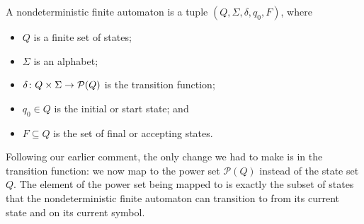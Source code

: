 \begin{definition}\label{def:NFA}
A nondeterministic finite automaton is a tuple $(Q, \Sigma, \delta, q_{0}, F)$, where
\begin{itemize}
\item $Q$ is a finite set of states;
\item $\Sigma$ is an alphabet;
\item $\delta \colon Q \times \Sigma \to \mathcal{P}(Q)$ is the transition function;
\item $q_{0} \in Q$ is the initial or start state; and
\item $F \subseteq Q$ is the set of final or accepting states.
\end{itemize}
\end{definition}

Following our earlier comment, the only change we had to make is in the transition function: we now map to the power set $\mathcal{P}(Q)$ instead of the state set $Q$. The element of the power set being mapped to is exactly the subset of states that the nondeterministic finite automaton can transition to from its current state and on its current symbol.

